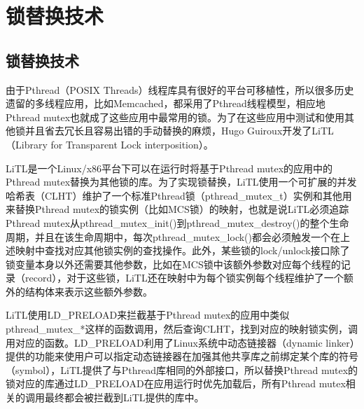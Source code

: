
\chapter{锁替换技术}
\section{锁替换技术}
由于Pthread（POSIX Threads）线程库具有很好的平台可移植性，所以很多历史遗留的多线程应用，比如Memcached，都采用了Pthread线程模型，相应地Pthread mutex也就成了这些应用中最常用的锁。为了在这些应用中测试和使用其他锁并且省去冗长且容易出错的手动替换的麻烦，Hugo Guiroux\cite{guiroux2016multicore}开发了LiTL（Library for Transparent Lock interposition）。

LiTL是一个Linux/x86平台下可以在运行时将基于Pthread mutex的应用中的Pthread mutex替换为其他锁的库。为了实现锁替换，LiTL使用一个可扩展的并发哈希表（CLHT\cite{david2015asynchronized}）维护了一个标准Pthread锁（pthread\_mutex\_t）实例和其他用来替换Pthread mutex的锁实例（比如MCS锁）的映射，也就是说LiTL必须追踪Pthread mutex从pthread\_mutex\_init()到pthread\_mutex\_destroy()的整个生命周期，并且在该生命周期中，每次pthread\_mutex\_lock()都会必须触发一个在上述映射中查找对应其他锁实例的查找操作。此外，某些锁的lock/unlock接口除了锁变量本身以外还需要其他参数，比如在MCS锁中该额外参数对应每个线程的记录（record），对于这些锁，LiTL还在映射中为每个锁实例每个线程维护了一个额外的结构体来表示这些额外参数。

LiTL使用LD\_PRELOAD来拦截基于Pthread mutex的应用中类似pthread\_mutex\_*这样的函数调用，然后查询CLHT，找到对应的映射锁实例，调用对应的函数。LD\_PRELOAD利用了Linux系统中动态链接器（dynamic linker）提供的功能来使用户可以指定动态链接器在加强其他共享库之前绑定某个库的符号（symbol），LiTL提供了与Pthread库相同的外部接口，所以替换Pthread mutex的锁对应的库通过LD\_PRELOAD在应用运行时优先加载后，所有Pthread mutex相关的调用最终都会被拦截到LiTL提供的库中。